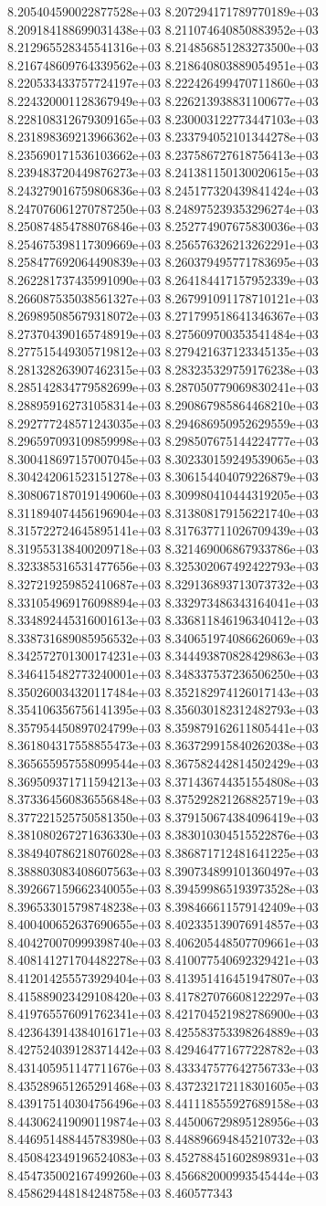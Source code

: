 8.205404590022877528e+03	8.207294171789770189e+03	8.209184188699031438e+03	8.211074640850883952e+03	8.212965528345541316e+03	8.214856851283273500e+03	8.216748609764339562e+03	8.218640803889054951e+03	8.220533433757724197e+03	8.222426499470711860e+03	8.224320001128367949e+03	8.226213938831100677e+03	8.228108312679309165e+03	8.230003122773447103e+03	8.231898369213966362e+03	8.233794052101344278e+03	8.235690171536103662e+03	8.237586727618756413e+03	8.239483720449876273e+03	8.241381150130020615e+03	8.243279016759806836e+03	8.245177320439841424e+03	8.247076061270787250e+03	8.248975239353296274e+03	8.250874854788076846e+03	8.252774907675830036e+03	8.254675398117309669e+03	8.256576326213262291e+03	8.258477692064490839e+03	8.260379495771783695e+03	8.262281737435991090e+03	8.264184417157952339e+03	8.266087535038561327e+03	8.267991091178710121e+03	8.269895085679318072e+03	8.271799518641346367e+03	8.273704390165748919e+03	8.275609700353541484e+03	8.277515449305719812e+03	8.279421637123345135e+03	8.281328263907462315e+03	8.283235329759176238e+03	8.285142834779582699e+03	8.287050779069830241e+03	8.288959162731058314e+03	8.290867985864468210e+03	8.292777248571243035e+03	8.294686950952629559e+03	8.296597093109859998e+03	8.298507675144224777e+03	8.300418697157007045e+03	8.302330159249539065e+03	8.304242061523151278e+03	8.306154404079226879e+03	8.308067187019149060e+03	8.309980410444319205e+03	8.311894074456196904e+03	8.313808179156221740e+03	8.315722724645895141e+03	8.317637711026709439e+03	8.319553138400209718e+03	8.321469006867933786e+03	8.323385316531477656e+03	8.325302067492422793e+03	8.327219259852410687e+03	8.329136893713073732e+03	8.331054969176098894e+03	8.332973486343164041e+03	8.334892445316001613e+03	8.336811846196340412e+03	8.338731689085956532e+03	8.340651974086626069e+03	8.342572701300174231e+03	8.344493870828429863e+03	8.346415482773240001e+03	8.348337537236506250e+03	8.350260034320117484e+03	8.352182974126017143e+03	8.354106356756141395e+03	8.356030182312482793e+03	8.357954450897024799e+03	8.359879162611805441e+03	8.361804317558855473e+03	8.363729915840262038e+03	8.365655957558099544e+03	8.367582442814502429e+03	8.369509371711594213e+03	8.371436744351554808e+03	8.373364560836556848e+03	8.375292821268825719e+03	8.377221525750581350e+03	8.379150674384096419e+03	8.381080267271636330e+03	8.383010304515522876e+03	8.384940786218076028e+03	8.386871712481641225e+03	8.388803083408607563e+03	8.390734899101360497e+03	8.392667159662340055e+03	8.394599865193973528e+03	8.396533015798748238e+03	8.398466611579142409e+03	8.400400652637690655e+03	8.402335139076914857e+03	8.404270070999398740e+03	8.406205448507709661e+03	8.408141271704482278e+03	8.410077540692329421e+03	8.412014255573929404e+03	8.413951416451947807e+03	8.415889023429108420e+03	8.417827076608122297e+03	8.419765576091762341e+03	8.421704521982786900e+03	8.423643914384016171e+03	8.425583753398264889e+03	8.427524039128371442e+03	8.429464771677228782e+03	8.431405951147711676e+03	8.433347577642756733e+03	8.435289651265291468e+03	8.437232172118301605e+03	8.439175140304756496e+03	8.441118555927689158e+03	8.443062419090119874e+03	8.445006729895128956e+03	8.446951488445783980e+03	8.448896694845210732e+03	8.450842349196524083e+03	8.452788451602898931e+03	8.454735002167499260e+03	8.456682000993545444e+03	8.458629448184248758e+03	8.460577343